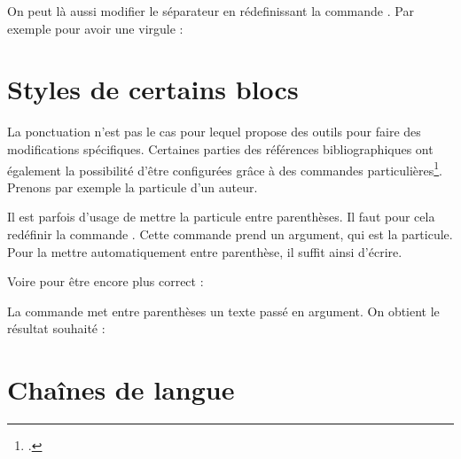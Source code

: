 On peut là aussi modifier le séparateur en rédefinissant la commande . Par exemple pour avoir une virgule :

\begin{latexcode}
\renewcommand{\multicitedelim}[0]{\addcomma\addspace}
\end{latexcode}


\section{Styles de certains blocs}

La ponctuation n'est pas le cas pour lequel   propose des outils pour faire des modifications spécifiques. Certaines parties des références bibliographiques ont également  la possibilité d'être configurées grâce à des commandes particulières\footcite{biblatex_hooks}. Prenons par exemple la particule d'un auteur.
    
    \bibverbose
    \begin{quotation}
    \cite{BeauvoirSexe}
    \end{quotation}
    
    \renewcommand{\mkbibnameprefix}[1]{\parentext{#1}}


    
Il est parfois d'usage de mettre la particule entre parenthèses. Il faut pour cela redéfinir la commande . Cette commande prend un argument, qui est la particule. Pour la mettre automatiquement entre parenthèse, il suffit ainsi d'écrire.
    
    \begin{latexcode}
\renewcommand{\mkbibnameprefix}[1]{(#1)}
    \end{latexcode}

    
Voire pour être encore plus correct :
    
    \begin{latexcode}
\renewcommand{\mkbibnameprefix}[1]{\parentext{#1}}
    \end{latexcode}


La commande  met entre parenthèses un texte passé en argument. On obtient le résultat souhaité : 

    \begin{quotation}
    \cite{BeauvoirSexe}
    \end{quotation}
    
\bibverbose

\section{Chaînes de langue}\label{i18nchaines}
    

